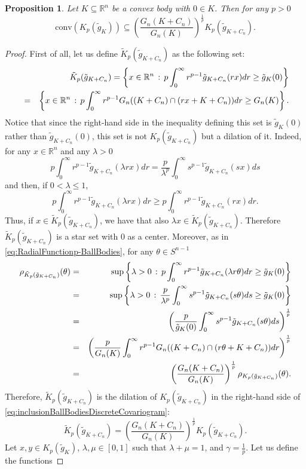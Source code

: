 \documentclass[10pt]{amsart}
\newtheorem{proposition}[thm]{Proposition}
\def\R{\mathbb{R}}
\numberwithin{equation}{section}
\begin{document}
\begin{proposition}\label{prop:ConvexityBallBodies}
Let $K\subseteq\R^n$ be a convex body with $0\in K$. Then for any $p>0$
$$
\textrm{conv}(K_p(\tilde{g}_K))\subseteq\left(\frac{G_n(K+C_n)}{G_n(K)}\right)^\frac{1}{p}K_p(\tilde{g}_{K+C_n}).
$$
\end{proposition}
\begin{proof}
First of all, let us define $\tilde{K}_p(\tilde{g}_{K+C_n})$ as the following set:
\begin{eqnarray*}
&&\tilde{K}_p(\tilde{g}_{K+C_n})=\left\{x\in\R^n\,:\,p\int_0^\infty r^{p-1}\tilde{g}_{K+C_n}(rx)dr\geq \tilde{g}_K(0)\right\}\cr
&=&\left\{x\in\R^n\,:\,p\int_0^\infty r^{p-1}G_n((K+C_n)\cap(rx+K+C_n))dr\geq G_n(K)\right\}.
\end{eqnarray*}
Notice that since the right-hand side in the inequality defining this set is $\tilde{g}_K(0)$ rather than $\tilde{g}_{K+C_n}(0)$, this set is not $K_p(\tilde{g}_{K+C_n})$ but a dilation of it. Indeed, for any $x\in\R^n$ and any $\lambda>0$
$$
p\int_0^\infty r^{p-1}\tilde{g}_{K+C_n}(\lambda r x)dr=\frac{p}{\lambda^p}\int_0^\infty s^{p-1}\tilde{g}_{K+C_n}(sx)ds
$$
and then, if $0<\lambda\leq 1$,
$$
p\int_0^\infty r^{p-1}\tilde{g}_{K+C_n}(\lambda r x)dr\geq p\int_0^\infty r^{p-1}\tilde{g}_{K+C_n}(rx)dr.
$$
Thus, if $x\in \tilde{K}_p(\tilde{g}_{K+C_n})$, we have that also $\lambda x\in \tilde{K}_p(\tilde{g}_{K+C_n})$. Therefore $\tilde{K}_p(\tilde{g}_{K+C_n})$ is a star set with $0$ as a center. Moreover, as in \eqref{eq:RadialFunctionp-BallBodies}, for any $\theta\in S^{n-1}$
\begin{eqnarray*}
\rho_{\tilde{K}_p(\tilde{g}_{K+C_n})}(\theta)&=&\sup\left\{\lambda>0\,:\,p\int_0^\infty r^{p-1}\tilde{g}_{K+C_n}(\lambda r\theta)dr\geq \tilde{g}_K(0)\right\}\cr
&=&\sup\left\{\lambda>0\,:\,\frac{p}{\lambda^p}\int_0^\infty s^{p-1}\tilde{g}_{K+C_n}(s\theta)ds\geq \tilde{g}_K(0)\right\}\cr
&=&\left(\frac{p}{\tilde{g}_K(0)}\int_0^\infty s^{p-1}\tilde{g}_{K+C_n}(s\theta)ds\right)^\frac{1}{p}\cr
&=&\left(\frac{p}{G_n(K)}\int_0^\infty r^{p-1}G_n((K+C_n)\cap(r\theta+K+C_n))dr\right)^\frac{1}{p}\cr
&=&\left(\frac{G_n(K+C_n)}{G_n(K)}\right)^\frac{1}{p}\rho_{K_p(\tilde{g}_{K+C_n})}(\theta).
\end{eqnarray*}
Therefore, $\tilde{K}_p(\tilde{g}_{K+C_n})$ is the dilation of $K_p(\tilde{g}_{K+C_n})$ in the right-hand side of \eqref{eq:inclusionBallBodiesDiscreteCovariogram}:
$$
\tilde{K}_p(\tilde{g}_{K+C_n})=\left(\frac{G_n(K+C_n)}{G_n(K)}\right)^{\frac{1}{p}}K_p(\tilde{g}_{K+C_n}).
$$
Let $x,y\in K_p(\tilde{g}_K)$, $\lambda,\mu\in[0,1]$ such that $\lambda+\mu=1$, and $\gamma=\frac{1}{p}$. Let us define the functions

\end{proof}
\end{document}
